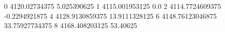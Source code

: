 0 4120.02734375 5.025390625
1 4115.001953125 0.0
2 4114.7724609375 -0.2294921875
4 4128.9130859375 13.9111328125
6 4148.76123046875 33.75927734375
8 4168.408203125 53.40625
